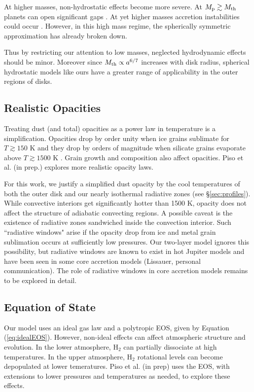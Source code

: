 \documentclass[apj, numberedappendix]{emulateapj}
\newcommand{\Eq}[1]{Equation\,(\ref{#1})}
\newcommand{\pla}{_{\rm p}}
\begin{document}
At higher masses, non-hydrostatic effects become more severe.  At $M\pla \gtrsim M_{\rm th}$ planets can open significant gaps \citep{zhu13}.  At yet higher masses accretion instabilities could occur \citep{AylBat12}.  However, in this high mass regime, the spherically symmetric approximation has already broken down. %

Thus by restricting our attention to low masses, neglected hydrodynamic effects should be minor.   Moreover since $M_{\rm th} \propto a^{6/7}$ increases with disk radius, spherical hydrostatic models like ours have a greater range of applicability in the outer regions of disks. 


\subsection{Realistic Opacities}\label{sec:op}

Treating dust (and total) opacities as a power law in temperature is a simplification.  Opacities drop by order unity when ice grains sublimate for $T \gtrsim 150$ K and they drop by orders of magnitude when silicate grains evaporate above $T \gtrsim 1500$ K \citep{semenov03, FerAle05}.  Grain growth and composition also affect opacities.  Piso et al. (in prep.) explores more realistic opacity laws.

For this work, we justify a simplified dust opacity by the cool temperatures of both the outer disk and our nearly isothermal radiative zones (see \S\ref{sec:profiles}).  While  convective interiors get significantly hotter than 1500 K, opacity does not affect the structure of adiabatic convecting regions.   A possible caveat is the existence of  radiative zones sandwiched inside the convection interior.  Such ``radiative windows" arise if the opacity drop from ice and metal grain sublimation occurs at sufficiently low pressures.  Our two-layer model ignores this possibility, but radiative windows are known to exist in hot Jupiter models \citep{burrows97, ab06} and have been seen in some core accretion models (Lissauer, personal communication).  The role of radiative windows in core accretion models remains to be explored in detail.


\subsection{Equation of State}
\label{sec:EOS}
 
Our model uses an ideal gas law and a polytropic EOS, given by \Eq{eq:idealEOS}.  However, non-ideal effects can affect atmospheric structure and evolution.  In the lower atmosphere, H$_2$ can partially dissociate at high temperatures.  In the upper atmosphere, H$_2$ rotational levels can become depopulated at lower temeratures.   Piso et al. (in prep) uses the \citet{saumon95} EOS, with extensions to lower pressures and temperatures as needed, to explore these effects.
\end{document}
